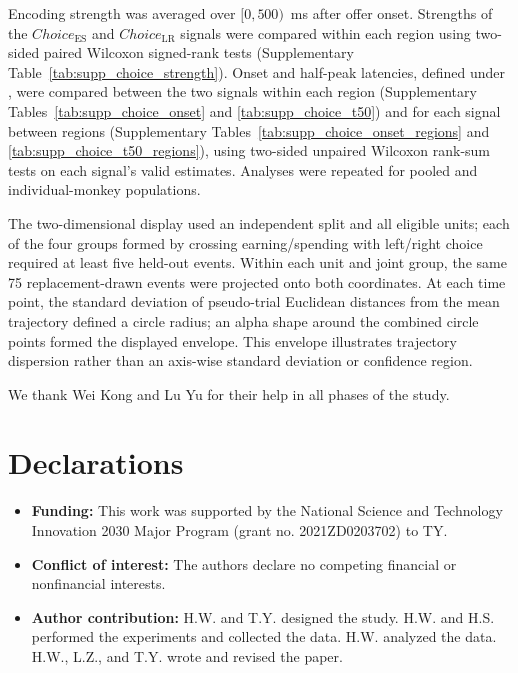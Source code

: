 \documentclass[pdflatex,sn-mathphys-num]{sn-jnl}%
\begin{document}
Encoding strength was averaged over $[0,500)$~ms after offer onset. Strengths of the $\mathit{Choice}_{\mathrm{ES}}$ and $\mathit{Choice}_{\mathrm{LR}}$ signals were compared within each region using two-sided paired Wilcoxon signed-rank tests (Supplementary Table~\ref{tab:supp_choice_strength}). Onset and half-peak latencies, defined under , were compared between the two signals within each region (Supplementary Tables~\ref{tab:supp_choice_onset} and \ref{tab:supp_choice_t50}) and for each signal between regions (Supplementary Tables~\ref{tab:supp_choice_onset_regions} and \ref{tab:supp_choice_t50_regions}), using two-sided unpaired Wilcoxon rank-sum tests on each signal's valid estimates. Analyses were repeated for pooled and individual-monkey populations.


The two-dimensional display used an independent split and all eligible units; each of the four groups formed by crossing earning/spending with left/right choice required at least five held-out events. Within each unit and joint group, the same 75 replacement-drawn events were projected onto both coordinates. At each time point, the standard deviation of pseudo-trial Euclidean distances from the mean trajectory defined a circle radius; an alpha shape around the combined circle points formed the displayed envelope. This envelope illustrates trajectory dispersion rather than an axis-wise standard deviation or confidence region.

\backmatter


We thank Wei Kong and Lu Yu for their help in all phases of the study.

\section*{Declarations}

\begin{itemize}
    \item \textbf{Funding:} This work was supported by the National Science and Technology Innovation 2030 Major Program (grant no. 2021ZD0203702) to TY.
    \item \textbf{Conflict of interest:} The authors declare no competing financial or nonfinancial interests.
    \item \textbf{Author contribution:} H.W. and T.Y. designed the study. H.W. and H.S. performed the experiments and collected the data. H.W. analyzed the data. H.W., L.Z., and T.Y. wrote and revised the paper.

\end{itemize}
\end{document}
